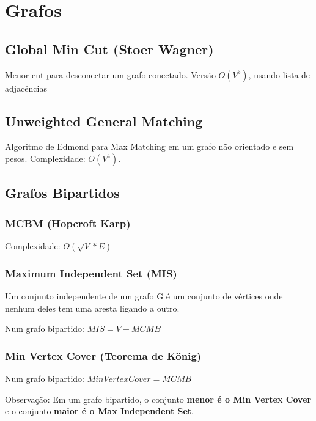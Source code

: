 \section{Grafos}

\subsection{Global Min Cut (Stoer Wagner)}
Menor cut para desconectar um grafo conectado. Vers\~{a}o $O(V^3)$, usando lista de adjac\^{e}ncias
\divisor

\subsection{Unweighted General Matching}
Algoritmo de Edmond para Max Matching em um grafo n\~{a}o orientado e sem pesos.
Complexidade: $O(V^4)$.


\divisor

\subsection{Grafos Bipartidos}

\subsubsection{MCBM (Hopcroft Karp)}
Complexidade: $O(\sqrt{V}*E)$
\divisor

\subsubsection{Maximum Independent Set (MIS)}
Um conjunto independente de um grafo G é um conjunto de vértices onde nenhum deles tem uma aresta ligando a outro.

Num grafo bipartido: $MIS = V - MCMB$
\divisor

\subsubsection{Min Vertex Cover (Teorema de König)}
Num grafo bipartido: $Min Vertex Cover = MCMB$

Observação: Em um grafo bipartido, o conjunto \textbf{menor é o Min Vertex Cover} e o conjunto \textbf{maior é o Max Independent Set}.
\divisor

